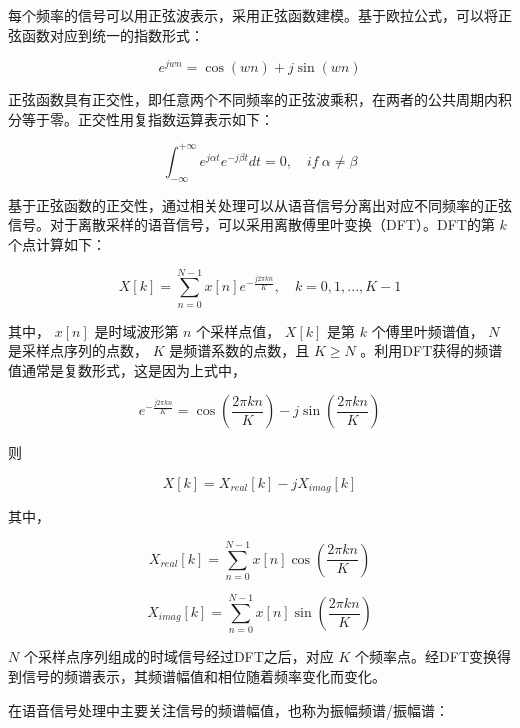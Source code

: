 \documentclass[cn,10pt,math=newtx,citestyle=gb7714-2015,bibstyle=gb7714-2015]{elegantbook}
\begin{document}
每个频率的信号可以用正弦波表示，采用正弦函数建模。基于欧拉公式，可以将正弦函数对应到统一的指数形式：

\begin{equation}
  e^{jwn}=\mathop{cos}(wn)+j\mathop{sin}(wn)
\end{equation}

正弦函数具有正交性，即任意两个不同频率的正弦波乘积，在两者的公共周期内积分等于零。正交性用复指数运算表示如下：

\begin{equation}
  \int_{-\infty}^{+\infty}e^{j\alpha t}e^{-j\beta t}dt=0,\quad if\ \alpha\neq \beta
\end{equation}

基于正弦函数的正交性，通过相关处理可以从语音信号分离出对应不同频率的正弦信号。对于离散采样的语音信号，可以采用离散傅里叶变换（DFT）。DFT的第 $k$ 个点计算如下：

\begin{equation}
  X[k]=\sum_{n=0}^{N-1} x[n]e^{-\frac{j2\pi kn}{K}},\quad k=0,1,...,K-1
\end{equation}

其中， $x[n]$ 是时域波形第 $n$ 个采样点值， $X[k]$ 是第 $k$ 个傅里叶频谱值， $N$ 是采样点序列的点数， $K$ 是频谱系数的点数，且 $K\geq N$ 。利用DFT获得的频谱值通常是复数形式，这是因为上式中，

\begin{equation}
  e^{-\frac{j2\pi kn}{K}}=\mathop{cos}(\frac{2\pi kn}{K})-j\mathop{sin}(\frac{2\pi kn}{K})
\end{equation}

则

\begin{equation}
  X[k]=X_{real}[k]-jX_{imag}[k]
\end{equation}

其中，

\begin{equation}
  X_{real}[k]=\sum_{n=0}^{N-1}x[n]\mathop{cos}(\frac{2\pi kn}{K})
\end{equation}

\begin{equation}
  X_{imag}[k]=\sum_{n=0}^{N-1}x[n]\mathop{sin}(\frac{2\pi kn}{K})
\end{equation}

$N$ 个采样点序列组成的时域信号经过DFT之后，对应 $K$ 个频率点。经DFT变换得到信号的频谱表示，其频谱幅值和相位随着频率变化而变化。

在语音信号处理中主要关注信号的频谱幅值，也称为振幅频谱/振幅谱：
\end{document}
